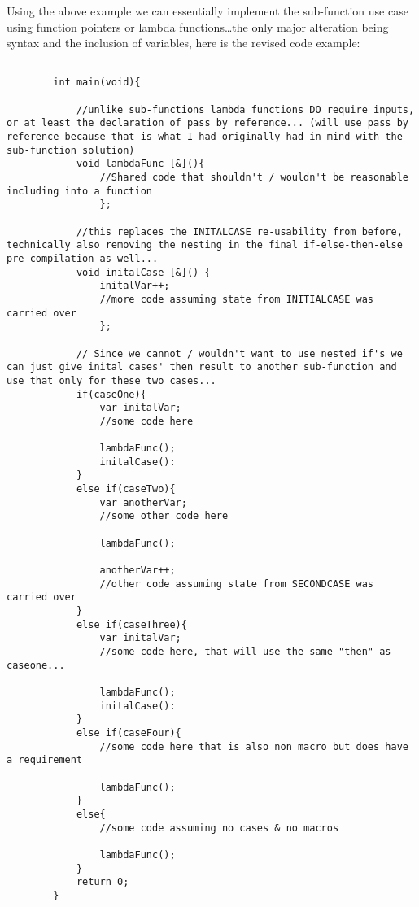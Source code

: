 \documentclass{article}
\begin{document}
        Using the above example we can essentially implement the sub-function use case using function pointers or lambda functions\dots the only major alteration being syntax and the inclusion of variables, here is the revised code example:

    \begin{lstlisting}
            
        int main(void){

            //unlike sub-functions lambda functions DO require inputs, or at least the declaration of pass by reference... (will use pass by reference because that is what I had originally had in mind with the sub-function solution)
            void lambdaFunc [&](){ 
                //Shared code that shouldn't / wouldn't be reasonable including into a function
                };
            
            //this replaces the INITALCASE re-usability from before, technically also removing the nesting in the final if-else-then-else pre-compilation as well...
            void initalCase [&]() { 
                initalVar++; 
                //more code assuming state from INITIALCASE was carried over
                };

            // Since we cannot / wouldn't want to use nested if's we can just give inital cases' then result to another sub-function and use that only for these two cases...
            if(caseOne){
                var initalVar;
                //some code here

                lambdaFunc();
                initalCase():
            }
            else if(caseTwo){
                var anotherVar;
                //some other code here

                lambdaFunc();

                anotherVar++;
                //other code assuming state from SECONDCASE was carried over
            }
            else if(caseThree){
                var initalVar;
                //some code here, that will use the same "then" as caseone...

                lambdaFunc();
                initalCase():
            }
            else if(caseFour){
                //some code here that is also non macro but does have a requirement

                lambdaFunc();
            }
            else{
                //some code assuming no cases & no macros

                lambdaFunc();
            }
            return 0;
        }
    \end{lstlisting}
    
\end{document}
